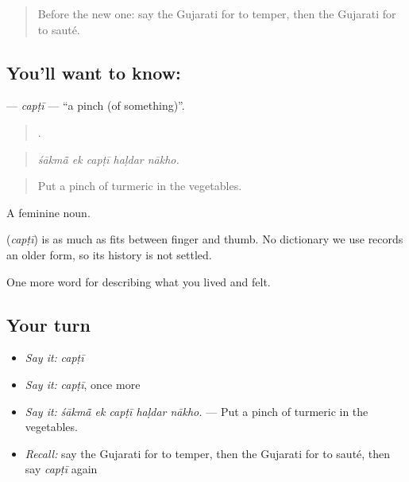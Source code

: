 \label{lesson:GU-C520-capti}



\begin{quote}
Before the new one: say the Gujarati for to temper, then the Gujarati for to sauté.
\end{quote}

\subsection*{You'll want to know: }
\textbf{} — \emph{capṭī} — \textquotedblleft{}a pinch (of something)\textquotedblright{}.

\begin{quote}
    .
\end{quote}

\begin{quote}
\emph{śākmā̃ ek capṭī haḷdar nākho.}
\end{quote}

\begin{quote}
Put a pinch of turmeric in the vegetables.
\end{quote}

A feminine noun.

\begin{cousinweb}
\textbf{} (\emph{capṭī}) is as much as fits between finger and thumb. No dictionary we use records an older form, so its history is not settled.
\end{cousinweb}

\begin{grammarlens}[title={What you've built}]
One more word for describing what you lived and felt.
\end{grammarlens}

\subsection*{Your turn}
\begin{itemize}
\raggedright
  \item \emph{Say it:} \emph{capṭī}
  \item \emph{Say it:} \emph{capṭī}, once more
  \item \emph{Say it:} \emph{śākmā̃ ek capṭī haḷdar nākho.} — Put a pinch of turmeric in the vegetables.
  \item \emph{Recall:} say the Gujarati for to temper, then the Gujarati for to sauté, then say \emph{capṭī} again
\end{itemize}

